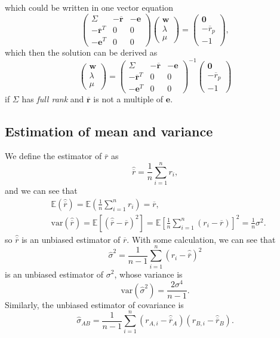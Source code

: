 \documentclass[twocolumn,landscape,10pt]{article}
\theoremstyle{definition}
\begin{document}
which could be written in one vector equation
\[
    \begin{pmatrix}
        \Sigma & -\overline{\mathbf{r}} & -\mathbf{e} \\
        -\overline{\mathbf{r}}^T & 0 & 0 \\
        -\mathbf{e}^T & 0 & 0
    \end{pmatrix} 
    \begin{pmatrix}
        \mathbf{w} \\
        \lambda \\
        \mu
    \end{pmatrix} 
    =
    \begin{pmatrix}
        \mathbf{0} \\
        -\overline{r}_p \\
        -1
    \end{pmatrix},
\]
which then the solution can be derived as
\[
    \begin{pmatrix}
        \mathbf{w} \\
        \lambda \\
        \mu
    \end{pmatrix} 
    =
    \begin{pmatrix}
        \Sigma & -\overline{\mathbf{r}} & -\mathbf{e} \\
        -\overline{\mathbf{r}}^T & 0 & 0 \\
        -\mathbf{e}^T & 0 & 0
    \end{pmatrix}^{-1}
    \begin{pmatrix}
        \mathbf{0} \\
        -\overline{r}_p \\
        -1
    \end{pmatrix}
\]
if $\Sigma$ has \emph{full rank} and $\overline{\mathbf{r}}$ is not a multiple
of $\mathbf{e}$.


\subsection{Estimation of mean and variance}

We define the estimator of $\overline{r}$ as
\[
    \hat{\overline{r}}=\frac{1}{n}\sum_{i=1}^{n}r_i,
\]
and we can see that
\begin{align*}
    &\mathbb{E}(\hat{\overline{r}})=\mathbb{E}\left(\frac{1}{n}\sum_{i=1}^{n}r_i\right)=\overline{r}, \\
    &\text{var}(\hat{\overline{r}})=\mathbb{E}\left[{(\hat{\overline{r}}-\overline{r})}^{2}\right]
    =\mathbb{E}\left[\frac{1}{n}\sum_{i=1}^{n}(r_i-\overline{r})\right]^2=\frac{1}{n}\sigma^2.
\end{align*}
so $\hat{\overline{r}}$ is an unbiased estimator of $\overline{r}$.
With some calculation, we can see that
\[
    \hat{\sigma}^2=\frac{1}{n-1}\sum_{i=1}^{n}{(r_i-\hat{\overline{r}})}^{2}
\]
is an unbiased estimator of $\sigma^2$, whose variance is
\[
    \text{var}(\hat{\sigma}^2)=\frac{2\sigma^4}{n-1}.
\]
Similarly, the unbiased estimator of covariance is
\[
    \hat{\sigma}_{AB}=\frac{1}{n-1}\sum_{i=1}^{n}(r_{A,i}-\hat{\overline{r}}_A)(r_{B,i}-\hat{\overline{r}}_B).
\]
\end{document}
